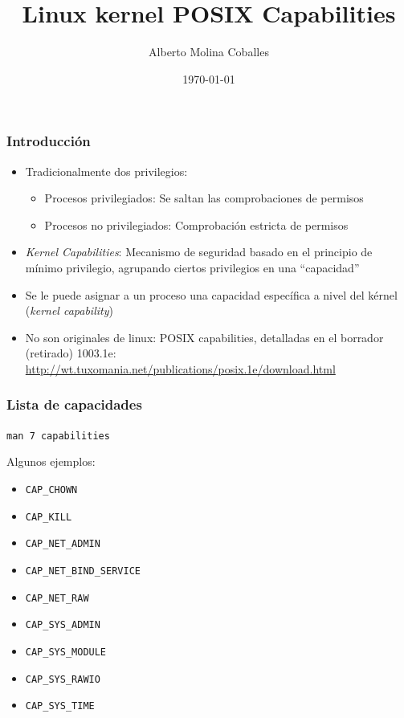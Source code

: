 \documentclass[aspectratio=169]{beamer}
\author{Alberto Molina Coballes}
\title{Linux kernel POSIX Capabilities}
\institute{IES Gonzalo Nazareno}
\date{\today}
\begin{document}
\def\braces#1{[#1]}

\begin{frame}[t,plain]
\titlepage
\end{frame}

\begin{frame}
  \frametitle{Introducción}
  \begin{itemize}
  \item Tradicionalmente dos privilegios:
    \begin{itemize}
    \item Procesos privilegiados: Se saltan las comprobaciones de permisos
    \item Procesos no privilegiados: Comprobación estricta de permisos
    \end{itemize}
  \item \textit{Kernel Capabilities}: Mecanismo de seguridad basado en
    el principio de mínimo privilegio, agrupando ciertos privilegios
    en una ``capacidad''
  \item Se le puede asignar a un proceso una capacidad específica a
    nivel del kérnel (\textit{kernel capability})
  \item No son originales de linux: POSIX capabilities, detalladas en
    el borrador (retirado) 1003.1e:
    \footnotesize{\url{http://wt.tuxomania.net/publications/posix.1e/download.html}}
  \end{itemize}
\end{frame}

\begin{frame}
  \frametitle{Lista de capacidades}
  \texttt{man 7 capabilities}\par
  Algunos ejemplos:
  \begin{itemize}
  \item \texttt{CAP\_CHOWN}
  \item \texttt{CAP\_KILL}
  \item \texttt{CAP\_NET\_ADMIN}
  \item \texttt{CAP\_NET\_BIND\_SERVICE}
  \item \texttt{CAP\_NET\_RAW}
  \item \texttt{CAP\_SYS\_ADMIN}
  \item \texttt{CAP\_SYS\_MODULE}
  \item \texttt{CAP\_SYS\_RAWIO}
  \item \texttt{CAP\_SYS\_TIME}
  \end{itemize}
\end{frame}
\end{document}
